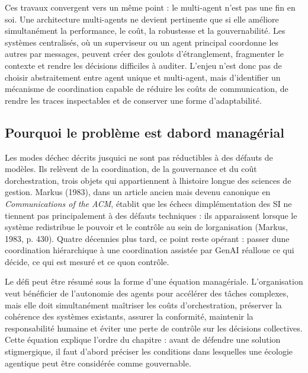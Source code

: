 Ces travaux convergent vers un même point : le multi-agent n'est pas une fin en soi. Une architecture multi-agents ne devient pertinente que si elle améliore simultanément la performance, le coût, la robustesse et la gouvernabilité. Les systèmes centralisés, où un superviseur ou un agent principal coordonne les autres par messages, peuvent créer des goulots d'étranglement, fragmenter le contexte et rendre les décisions difficiles à auditer. L'enjeu n'est donc pas de choisir abstraitement entre agent unique et multi-agent, mais d'identifier un mécanisme de coordination capable de réduire les coûts de communication, de rendre les traces inspectables et de conserver une forme d'adaptabilité.


\subsection{Pourquoi le probl\`eme est d\textquotesingle abord manag\'erial}

Les modes d\textquotesingle échec décrits jusqu\textquotesingle ici ne
sont pas réductibles à des défauts de modèles. Ils relèvent de la
coordination, de la gouvernance et du coût d\textquotesingle orchestration,
trois objets qui appartiennent à l\textquotesingle histoire longue des
sciences de gestion. Markus (1983), dans un article ancien mais devenu
canonique en \emph{Communications of the ACM}, établit que les échecs
d\textquotesingle implémentation des SI ne tiennent pas principalement
à des défauts techniques : ils apparaissent lorsque le système
redistribue le pouvoir et le contrôle au sein de
l\textquotesingle organisation (Markus, 1983, p. 430). Quatre décennies
plus tard, ce point reste opérant : passer d\textquotesingle une
coordination hiérarchique à une coordination assistée par GenAI
réalloue ce qui décide, ce qui est mesuré et ce
qu\textquotesingle on contrôle.

Le défi peut être résumé sous la forme d'une équation managériale. L'organisation veut bénéficier de l'autonomie des agents pour accélérer des tâches complexes, mais elle doit simultanément maîtriser les coûts d'orchestration, préserver la cohérence des systèmes existants, assurer la conformité, maintenir la responsabilité humaine et éviter une perte de contrôle sur les décisions collectives. Cette équation explique l'ordre du chapitre : avant de défendre une solution stigmergique, il faut d'abord préciser les conditions dans lesquelles une écologie agentique peut être considérée comme gouvernable.

